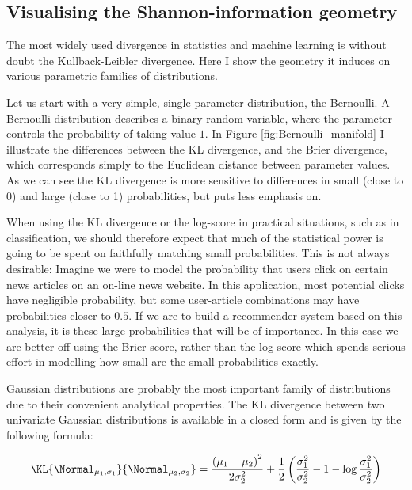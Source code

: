 \subsection{Visualising the Shannon-information geometry}

The most widely used divergence in statistics and machine learning is without doubt the Kullback-Leibler divergence. Here I show the geometry it induces on various parametric families of distributions.

Let us start with a very simple, single parameter distribution, the Bernoulli. A Bernoulli distribution describes a binary random variable, where the parameter controls the probability of taking value $1$. In Figure \ref{fig:Bernoulli_manifold} I illustrate the differences between the KL divergence, and the Brier divergence, which corresponds simply to the Euclidean distance between parameter values. As we can see the KL divergence is more sensitive to differences in small (close to 0) and large (close to 1) probabilities, but puts less emphasis on.

When using the KL divergence or the log-score in practical situations, such as in classification, we should therefore expect that much of the statistical power is going to be spent on faithfully matching small probabilities. This is not always desirable: Imagine we were to model the probability that users click on certain news articles on an on-line news website. In this application, most potential clicks have negligible probability, but some user-article combinations may have probabilities closer to $0.5$. If we are to build a recommender system based on this analysis, it is these large probabilities that will be of importance. In this case we are better off using the Brier-score, rather than the log-score which spends serious effort in modelling how small are the small probabilities exactly.

Gaussian distributions are probably the most important family of distributions due to their convenient analytical properties. 
The KL divergence between two univariate Gaussian distributions is available in a closed form and is given by the following formula:

\begin{equation}
	\KL{\Normal_{\mu_1,\sigma_1}}{\Normal_{\mu_2,\sigma_2}} = \frac{\left(\mu_1 - \mu_2\right)^2}{2\sigma_2^2} + \frac{1}{2}\left(\frac{\sigma_1^2}{\sigma_2^2} - 1 - \log\frac{\sigma_1^2}{\sigma_2^2}\right)
\end{equation}


